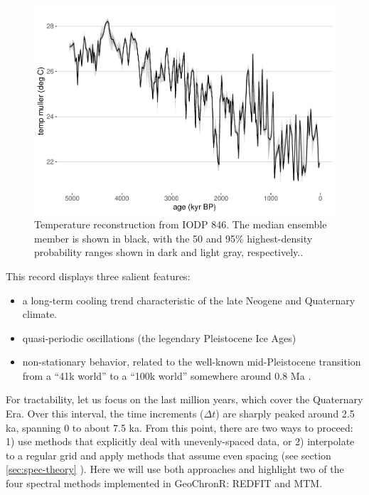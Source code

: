 \documentclass[gchron, manuscript]{copernicus}
\begin{document}
\begin{figure}
\includegraphics[width=12cm]{geoChronR-paper_files/figure-latex/odp846-timeseries-1} \caption{Temperature reconstruction from IODP 846. The median ensemble member is shown in black, with the 50 and 95\% highest-density probability ranges shown in dark and light gray, respectively..}\label{fig:odp846-timeseries}
\end{figure}

This record displays three salient features:

\begin{itemize}
\item
  a long-term cooling trend characteristic of the late Neogene and Quaternary climate.
\item
  quasi-periodic oscillations (the legendary Pleistocene Ice Ages)
\item
  non-stationary behavior, related to the well-known mid-Pleistocene transition from a ``41k world'' to a ``100k world'' somewhere around 0.8 Ma \citep{Paillard_2001, lisiecki2005, ahn2017}.
\end{itemize}

For tractability, let us focus on the last million years, which cover the Quaternary Era.
Over this interval, the time increments (\(\Delta t\)) are sharply peaked around 2.5 ka, spanning 0 to about 7.5 ka.
From this point, there are two ways to proceed: 1) use methods that explicitly deal with unevenly-spaced data, or 2) interpolate to a regular grid and apply methods that assume even spacing (see section \ref{sec:spec-theory} ). Here we will use both approaches and highlight two of the four spectral methods implemented in GeoChronR: REDFIT and MTM.
\end{document}
